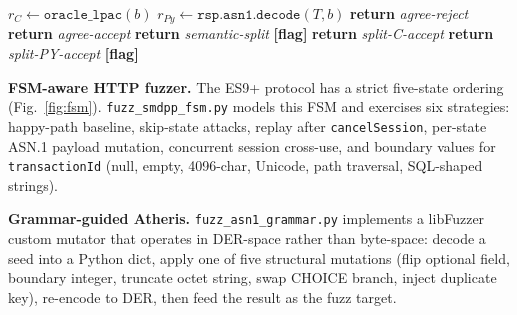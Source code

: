 \documentclass[final,3p,times,twocolumn]{elsarticle}
\begin{document}
\begin{algorithm}[t]
\caption{Differential ASN.1 Oracle (input: bytes $b$, type $T$)}\label{alg:oracle}
\begin{algorithmic}[1]
\State $r_C   \gets \texttt{oracle\_lpac}(b)$
\State $r_{Py}\gets \texttt{rsp.asn1.decode}(T, b)$
    \State \textbf{return} \textit{agree-reject}
        \State \textbf{return} \textit{agree-accept}
    \Else
        \State \textbf{return} \textit{semantic-split} \textbf{[flag]}
    \EndIf
{}
    \State \textbf{return} \textit{split-C-accept}
\Else
    \State \textbf{return} \textit{split-PY-accept} \textbf{[flag]}
\EndIf
\end{algorithmic}
\end{algorithm}

\textbf{FSM-aware HTTP fuzzer.}
The ES9+ protocol has a strict five-state ordering
(Fig.~\ref{fig:fsm}).
\texttt{fuzz\_smdpp\_fsm.py} models this FSM and exercises six strategies:
happy-path baseline, skip-state attacks, replay after \texttt{cancelSession},
per-state ASN.1 payload mutation, concurrent session cross-use, and
boundary values for \texttt{transactionId} (null, empty, 4096-char, Unicode,
path traversal, SQL-shaped strings).

\textbf{Grammar-guided Atheris.}
\texttt{fuzz\_asn1\_grammar.py} implements a libFuzzer custom mutator that
operates in DER-space rather than byte-space: decode a seed into a Python dict,
apply one of five structural mutations (flip optional field, boundary integer,
truncate octet string, swap CHOICE branch, inject duplicate key), re-encode
to DER, then feed the result as the fuzz target.
\end{document}

